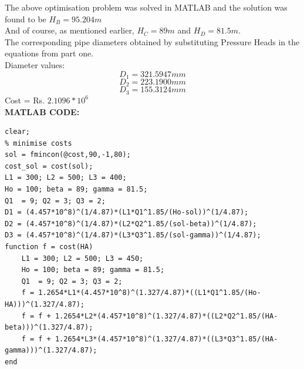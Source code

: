 \documentclass{homework}
\begin{document}
The above optimisation problem was solved in MATLAB and the solution was found to be $H_B = 95.204m$ \\ And of course, as mentioned earlier, $H_C = 89m$ and $H_D = 81.5m$. \\
The corresponding pipe diameters obtained by substituting Pressure Heads in the equations from part one. \\
Diameter values:
\[D_1 = 321.5947 mm\]
\[D_2 = 223.1900 mm\]
\[D_3 = 155.3124 mm\]
Cost = Rs. $2.1096 * 10^6$\\
\textbf{MATLAB CODE:}
    \begin{verbatim}
clear;
% minimise costs
sol = fmincon(@cost,90,-1,80);
cost_sol = cost(sol);
L1 = 300; L2 = 500; L3 = 400;
Ho = 100; beta = 89; gamma = 81.5;
Q1  = 9; Q2 = 3; Q3 = 2;
D1 = (4.457*10^8)^(1/4.87)*(L1*Q1^1.85/(Ho-sol))^(1/4.87);
D2 = (4.457*10^8)^(1/4.87)*(L2*Q2^1.85/(sol-beta))^(1/4.87);
D3 = (4.457*10^8)^(1/4.87)*(L3*Q3^1.85/(sol-gamma))^(1/4.87);
function f = cost(HA)
    L1 = 300; L2 = 500; L3 = 450;
    Ho = 100; beta = 89; gamma = 81.5;
    Q1  = 9; Q2 = 3; Q3 = 2;
    f = 1.2654*L1*(4.457*10^8)^(1.327/4.87)*((L1*Q1^1.85/(Ho-HA)))^(1.327/4.87);
    f = f + 1.2654*L2*(4.457*10^8)^(1.327/4.87)*((L2*Q2^1.85/(HA-beta)))^(1.327/4.87);
    f = f + 1.2654*L3*(4.457*10^8)^(1.327/4.87)*((L3*Q3^1.85/(HA-gamma)))^(1.327/4.87);
end
\end{verbatim}
\end{document}
